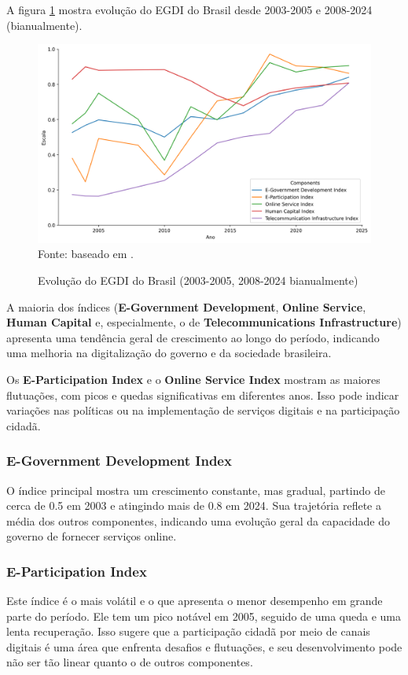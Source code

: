 A figura \ref{fig:lineplot_egdi_brasil} mostra evolução do EGDI do Brasil desde 2003-2005 e 2008-2024 (bianualmente).

\begin{figure}[H]
	\centering
	\caption{Evolução do EGDI do Brasil (2003-2005, 2008-2024 bianualmente)}
	\includegraphics[width=1\linewidth]{figuras/egdi/lineplot_egdi_brasil.png}
	\label{fig:lineplot_egdi_brasil}
	\footnotesize{Fonte: baseado em \cite{ONU_EGDI_mapa}.}
\end{figure}

A maioria dos índices (\textbf{E-Government Development}, \textbf{Online Service},  \textbf{Human Capital} e, especialmente, o de  \textbf{Telecommunications Infrastructure}) apresenta uma tendência geral de crescimento ao longo do período, indicando uma melhoria na digitalização do governo e da sociedade brasileira.

Os  \textbf{E-Participation Index} e o \textbf{Online Service Index} mostram as maiores flutuações, com picos e quedas significativas em diferentes anos. Isso pode indicar variações nas políticas ou na implementação de serviços digitais e na participação cidadã.

\subsubsection{E-Government Development Index} O índice principal mostra um crescimento constante, mas gradual, partindo de cerca de 0.5 em 2003 e atingindo mais de 0.8 em 2024. Sua trajetória reflete a média dos outros componentes, indicando uma evolução geral da capacidade do governo de fornecer serviços online.

\subsubsection{E-Participation Index} Este índice é o mais volátil e o que apresenta o menor desempenho em grande parte do período. Ele tem um pico notável em 2005, seguido de uma queda e uma lenta recuperação. Isso sugere que a participação cidadã por meio de canais digitais é uma área que enfrenta desafios e flutuações, e seu desenvolvimento pode não ser tão linear quanto o de outros componentes.

